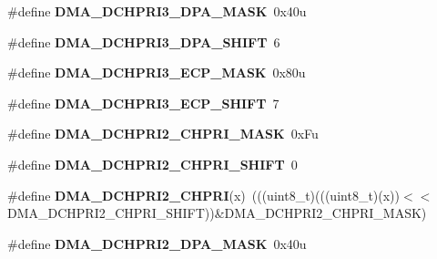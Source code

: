\begin{DoxyCompactItemize}
\item 
\#define {\bfseries D\+M\+A\+\_\+\+D\+C\+H\+P\+R\+I3\+\_\+\+D\+P\+A\+\_\+\+M\+A\+SK}~0x40u\hypertarget{group__DMA__Register__Masks_gaef70570689d5f3d820526668a189e615}{}\label{group__DMA__Register__Masks_gaef70570689d5f3d820526668a189e615}

\item 
\#define {\bfseries D\+M\+A\+\_\+\+D\+C\+H\+P\+R\+I3\+\_\+\+D\+P\+A\+\_\+\+S\+H\+I\+FT}~6\hypertarget{group__DMA__Register__Masks_ga3efa0a806b45176edb7f736daf5ee774}{}\label{group__DMA__Register__Masks_ga3efa0a806b45176edb7f736daf5ee774}

\item 
\#define {\bfseries D\+M\+A\+\_\+\+D\+C\+H\+P\+R\+I3\+\_\+\+E\+C\+P\+\_\+\+M\+A\+SK}~0x80u\hypertarget{group__DMA__Register__Masks_gabb8c04abc8cce4060af92862f34ed168}{}\label{group__DMA__Register__Masks_gabb8c04abc8cce4060af92862f34ed168}

\item 
\#define {\bfseries D\+M\+A\+\_\+\+D\+C\+H\+P\+R\+I3\+\_\+\+E\+C\+P\+\_\+\+S\+H\+I\+FT}~7\hypertarget{group__DMA__Register__Masks_ga35828808080f8f51927f8731cf8be7bd}{}\label{group__DMA__Register__Masks_ga35828808080f8f51927f8731cf8be7bd}

\item 
\#define {\bfseries D\+M\+A\+\_\+\+D\+C\+H\+P\+R\+I2\+\_\+\+C\+H\+P\+R\+I\+\_\+\+M\+A\+SK}~0x\+Fu\hypertarget{group__DMA__Register__Masks_gaa13f7f19a25ff7ec4c566803d9ab48b8}{}\label{group__DMA__Register__Masks_gaa13f7f19a25ff7ec4c566803d9ab48b8}

\item 
\#define {\bfseries D\+M\+A\+\_\+\+D\+C\+H\+P\+R\+I2\+\_\+\+C\+H\+P\+R\+I\+\_\+\+S\+H\+I\+FT}~0\hypertarget{group__DMA__Register__Masks_gaf8e134ae4fb5fe5af8e99f78b9e7d958}{}\label{group__DMA__Register__Masks_gaf8e134ae4fb5fe5af8e99f78b9e7d958}

\item 
\#define {\bfseries D\+M\+A\+\_\+\+D\+C\+H\+P\+R\+I2\+\_\+\+C\+H\+P\+RI}(x)~(((uint8\+\_\+t)(((uint8\+\_\+t)(x))$<$$<$D\+M\+A\+\_\+\+D\+C\+H\+P\+R\+I2\+\_\+\+C\+H\+P\+R\+I\+\_\+\+S\+H\+I\+FT))\&D\+M\+A\+\_\+\+D\+C\+H\+P\+R\+I2\+\_\+\+C\+H\+P\+R\+I\+\_\+\+M\+A\+SK)\hypertarget{group__DMA__Register__Masks_gadbc9d1829aeacdc6f53ebc706cbff015}{}\label{group__DMA__Register__Masks_gadbc9d1829aeacdc6f53ebc706cbff015}

\item 
\#define {\bfseries D\+M\+A\+\_\+\+D\+C\+H\+P\+R\+I2\+\_\+\+D\+P\+A\+\_\+\+M\+A\+SK}~0x40u\hypertarget{group__DMA__Register__Masks_gabb7c0ad697d56ee419d906f85515f222}{}\label{group__DMA__Register__Masks_gabb7c0ad697d56ee419d906f85515f222}


\end{DoxyCompactItemize}
